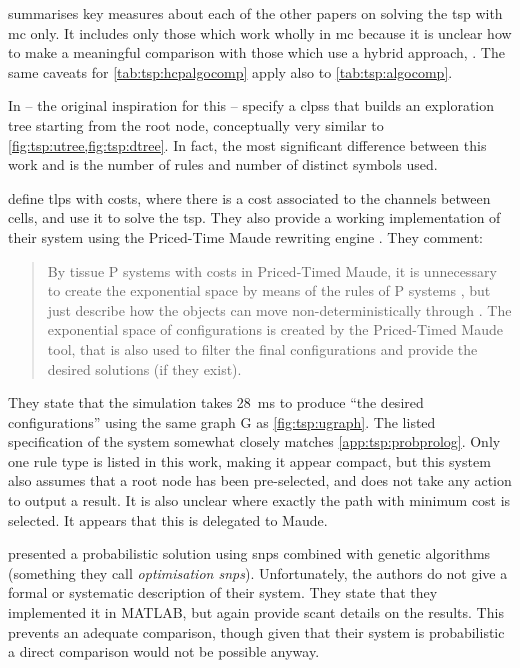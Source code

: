  summarises key measures about each of the other papers on solving the \gls{tsp} with \gls{mc} only.  It includes only those which work wholly in \gls{mc} because it is unclear how to make a meaningful comparison with those which use a hybrid approach, \eg{} \cite{Nishida2006}.  The same caveats for \cref{tab:tsp:hcpalgocomp} apply also to \cref{tab:tsp:algocomp}.


In \cite{Guo2017} -- the original inspiration for this  -- \citeauthor{Guo2017} specify a \glspl{clps} that builds an exploration tree starting from the root node, conceptually very similar to \cref{fig:tsp:utree,fig:tsp:dtree}.  In fact, the most significant difference between this work and \cite{Guo2017} is the number of rules and number of distinct symbols used.


\citeauthor{Aman2021} \cite{Aman2021} define \gls{tlps} with costs, where there is a cost associated to the channels between cells, and use it to solve the \gls{tsp}.
They also provide a working implementation of their system using the Priced-Time Maude rewriting engine \cite{Bendiksen2009}.  They comment: \blockquote{By  tissue P systems with costs in Priced-Timed Maude, it is unnecessary to create the exponential space by means of the rules of P systems , but just describe how the objects can move non-deterministically through .  The exponential space of configurations is created by \textelp{} the Priced-Timed Maude tool, that is also used to filter the final configurations and provide the desired solutions (if they exist).}
They state that the simulation takes \qty{28}{\milli\second} to produce \enquote{the desired configurations} using the same graph G as \cref{fig:tsp:ugraph}.  The listed specification of the system somewhat closely matches \cref{app:tsp:probprolog}.
Only one rule type is listed in this work, making it appear compact, but this system also assumes that a root node has been pre-selected, and does not take any action to output a result.  It is also unclear where exactly the path with minimum cost is selected.  It appears that this is delegated to Maude.


\citeauthor{Qi2018} \cite{Qi2018} presented a probabilistic solution using \gls{snps} combined with genetic algorithms (something they call \emph{optimisation \gls{snps}}).  Unfortunately, the authors do not give a formal or systematic description of their system.  They state that they implemented it in MATLAB, but again provide scant details on the results.  This prevents an adequate comparison, though given that their system is probabilistic a direct comparison would not be possible anyway.

